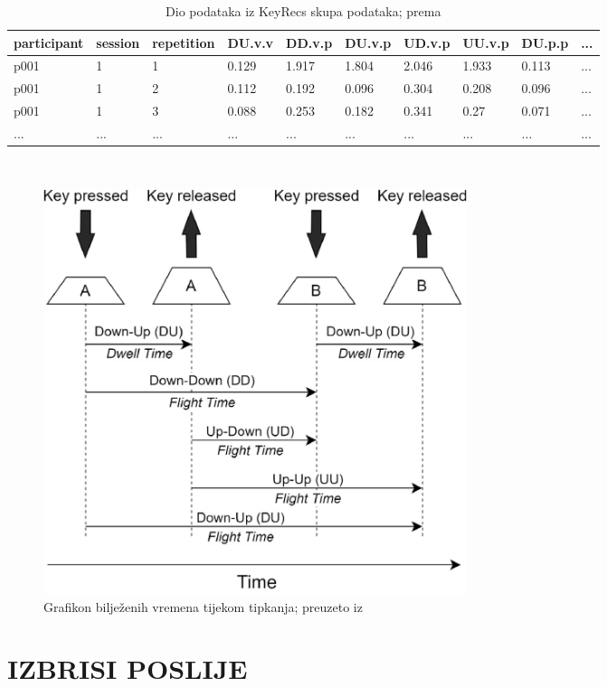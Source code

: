 \documentclass[]{foi}
\begin{document}
\begin{table}[!h]
    \centering
    \caption{Dio podataka iz KeyRecs skupa podataka; prema \cite{Dias2023}}
    \begin{tabularx}{1\textwidth}{|l|l|l|l|l|l|l|l|l|l|}
    \hline
        \cellcolor{gray!25}participant & \cellcolor{gray!25}session & \cellcolor{gray!25}repetition & \cellcolor{gray!25}DU.v.v & \cellcolor{gray!25}DD.v.p & \cellcolor{gray!25}DU.v.p & \cellcolor{gray!25}UD.v.p & \cellcolor{gray!25}UU.v.p & \cellcolor{gray!25}DU.p.p & \cellcolor{gray!25}... \\ \hline
        p001 & 1 & 1 & 0.129 & 1.917 & 1.804 & 2.046 & 1.933 & 0.113 & ... \\ \hline
        p001 & 1 & 2 & 0.112 & 0.192 & 0.096 & 0.304 & 0.208 & 0.096 & ... \\ \hline
        p001 & 1 & 3 & 0.088 & 0.253 & 0.182 & 0.341 & 0.27 & 0.071 & ... \\ \hline
        ... & ... & ... & ... & ... & ... & ... & ... & ... & ... \\ \hline
    \end{tabularx}
    \\[10pt]
    \label{tab:KeyRecs-podaci}
\end{table}


\begin{figure}[!h]
    \centering
    \includegraphics[width=0.6\textwidth]{slike/tipkanje-graf.jpg}
    \caption{Grafikon bilježenih vremena tijekom tipkanja; preuzeto iz \cite{Dias2023}}
    \label{fig:graf-vremena-tipkanja}
\end{figure}







\chapter{IZBRISI POSLIJE}
\end{document}
